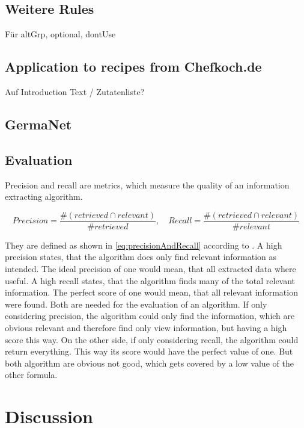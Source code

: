 \documentclass[12pt, twoside]{report}
\begin{document}
\section{Weitere Rules}
Für altGrp, optional, dontUse

\section{Application to recipes from Chefkoch.de}
Auf Introduction Text / Zutatenliste?

\section{GermaNet}

\section{Evaluation}
Precision and recall are metrics, which measure the quality of an information extracting algorithm.

\begin{equation} \label{eq:precisionAndRecall}
Precision = \frac{\#(retrieved \cap relevant)}{\#retrieved}, \hspace{1em} Recall = \frac{\#(retrieved \cap relevant)}{\#relevant}
\end{equation}

They are defined as shown in \cref{eq:precisionAndRecall} according to \parencite{surveyOfTextMining}. A high precision states, that the algorithm does only find relevant information as intended. The ideal precision of one would mean, that all extracted data where useful. A high recall states, that the algorithm finds many of the total relevant information. The perfect score of one would mean, that all relevant information were found. Both are needed for the evaluation of an algorithm. If only considering precision, the algorithm could only find the information, which are obvious relevant and therefore find only view information, but having a high score this way. On the other side, if only considering recall, the algorithm could return everything. This way its score would have the perfect value of one. But both algorithm are obvious not good, which gets covered by a low value of the other formula.



\chapter{Discussion}
\end{document}
